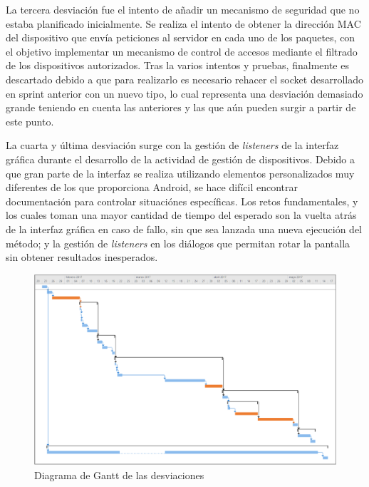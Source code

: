 \documentclass[12pt]{article}
\begin{document}
        La tercera desviación fue el intento de añadir un mecanismo de seguridad que no estaba planificado inicialmente. Se realiza el intento de obtener la dirección MAC del dispositivo que envía peticiones al servidor en cada uno de los paquetes, con el objetivo implementar un mecanismo de control de accesos mediante el filtrado de los dispositivos autorizados. Tras la varios intentos y pruebas, finalmente es descartado debido a que para realizarlo es necesario rehacer el socket desarrollado en sprint anterior con un nuevo tipo, lo cual representa una desviación demasiado grande teniendo en cuenta las anteriores y las que aún pueden surgir a partir de este punto.

        La cuarta y última desviación surge con la gestión de \textit{listeners} de la interfaz gráfica durante el desarrollo de la actividad de gestión de dispositivos. Debido a que gran parte de la interfaz se realiza utilizando elementos personalizados muy diferentes de los que proporciona Android, se hace difícil encontrar documentación para controlar situaciónes específicas. Los retos fundamentales, y los cuales toman una mayor cantidad de tiempo del esperado son la vuelta atrás de la interfaz gráfica en caso de fallo, sin que sea lanzada una nueva ejecución del método; y la gestión de \textit{listeners} en los diálogos que permitan rotar la pantalla sin obtener resultados inesperados.
        
        \begin{figure}[h!]
            \centering
                \includegraphics[scale=0.7]{deviations_gantt.eps}
                \caption{Diagrama de Gantt de las desviaciones}
                \label{fig:deviations_gantt}
        \end{figure}
\end{document}
